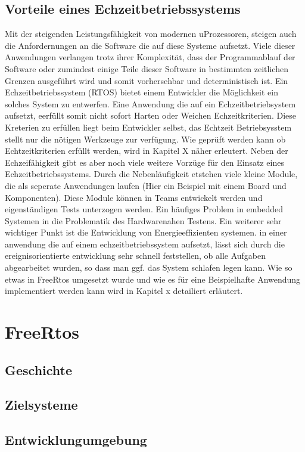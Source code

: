 \documentclass[ngerman]{seminarvorlage}
\begin{document}
\subsection{Vorteile eines Echzeitbetriebssystems}
Mit der steigenden Leistungsfähigkeit von modernen uProzessoren, steigen auch die Anfordernungen an die Software die auf diese Systeme aufsetzt.
Viele dieser Anwendungen verlangen trotz ihrer Komplexität, dass der Programmablauf der Software oder zumindest einige Teile dieser Software in bestimmten zeitlichen Grenzen ausgeführt wird und somit vorhersehbar und deterministisch ist.
Ein Echzeitbetriebssystem (RTOS) bietet einem Entwickler die Möglichkeit ein solches System zu entwerfen. Eine Anwendung die auf ein Echzeitbetriebsystem aufsetzt, eerfüllt somit nicht sofort Harten oder Weichen Echzeitkriterien. Diese Kreterien zu erfüllen liegt beim Entwickler selbst, das Echtzeit Betriebsysstem stellt nur die nötigen Werkzeuge zur verfügung. Wie geprüft werden kann ob Echtzeitkriterien erfüllt werden, wird in Kapitel X näher erleutert.  
Neben der Echzeifähigkeit gibt es aber noch viele weitere Vorzüge für den Einsatz eines Echzeitbetriebssystems.  
Durch die Nebenläufigkeit etstehen viele kleine Module, die als seperate Anwendungen laufen (Hier ein Beispiel mit einem Board und Komponenten). Diese Module können in Teams entwickelt werden und eigenständigen Tests unterzogen werden. Ein häufiges Problem in embedded Systemen in die Problematik des Hardwarenahen Testens. Ein weiterer sehr wichtiger Punkt ist die Entwicklung von Energieeffizienten systemen. in einer anwendung die auf einem echzeitbetriebssystem aufsetzt, lässt sich durch die ereignisorientierte entwicklung sehr schnell feststellen, ob alle Aufgaben abgearbeitet wurden, so dass man ggf. das System schlafen legen kann. Wie so etwas in FreeRtos umgesetzt wurde und wie es für eine Beispielhafte Anwendung implementiert werden kann wird in Kapitel x detailiert erläutert.  
 
\section{FreeRtos} 
\subsection{Geschichte}
\subsection{Zielsysteme}
\subsection{Entwicklungumgebung}
\end{document}
